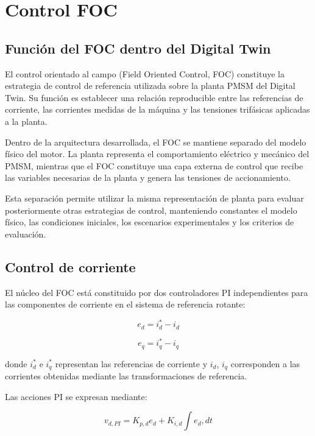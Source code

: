\section{Control FOC}

\subsection{Función del FOC dentro del Digital Twin}

El control orientado al campo (Field Oriented Control, FOC) constituye la estrategia de control de referencia utilizada sobre la planta PMSM del Digital Twin. Su función es establecer una relación reproducible entre las referencias de corriente, las corrientes medidas de la máquina y las tensiones trifásicas aplicadas a la planta.

Dentro de la arquitectura desarrollada, el FOC se mantiene separado del modelo físico del motor. La planta representa el comportamiento eléctrico y mecánico del PMSM, mientras que el FOC constituye una capa externa de control que recibe las variables necesarias de la planta y genera las tensiones de accionamiento.

Esta separación permite utilizar la misma representación de planta para evaluar posteriormente otras estrategias de control, manteniendo constantes el modelo físico, las condiciones iniciales, los escenarios experimentales y los criterios de evaluación.

\subsection{Control de corriente}

El núcleo del FOC está constituido por dos controladores PI independientes para las componentes de corriente en el sistema de referencia rotante:

\begin{equation}
e_d = i_d^{*}-i_d
\end{equation}

\begin{equation}
e_q = i_q^{*}-i_q
\end{equation}

donde $i_d^{*}$ e $i_q^{*}$ representan las referencias de corriente y $i_d$, $i_q$ corresponden a las corrientes obtenidas mediante las transformaciones de referencia.

Las acciones PI se expresan mediante:

\begin{equation}
v_{d,PI}=K_{p,d}e_d+K_{i,d}\int e_d,dt
\end{equation}

